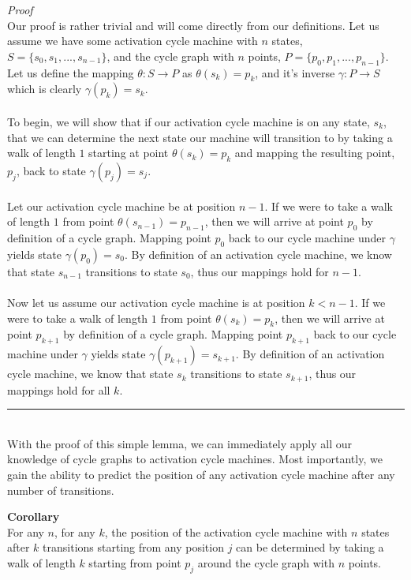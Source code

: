 \documentclass[a4paper,12pt]{article}
\begin{document}
\noindent
\textit{Proof}\\
Our proof is rather trivial and will come directly from our definitions. Let us assume we have some activation cycle machine with $n$ states, $S = \{s_0, s_1, ..., s_{n-1}\}$, and the cycle graph with $n$ points, $P = \{p_0, p_1, ..., p_{n-1}\}$. Let us define the mapping $\theta: S \rightarrow P$ as $\theta(s_k) = p_k$, and it's inverse $\gamma: P \rightarrow S$ which is clearly $\gamma(p_k) = s_k$.\\
\\
To begin, we will show that if our activation cycle machine is on any state, $s_k$, that we can determine the next state our machine will transition to by taking a walk of length $1$ starting at point $\theta(s_k) = p_k$ and mapping the resulting point, $p_j$, back to state $\gamma(p_j) = s_j$.\\
\\
Let our activation cycle machine be at position $n - 1$. If we were to take a walk of length $1$ from point $\theta(s_{n-1}) = p_{n-1}$, then we will arrive at point $p_0$ by definition of a cycle graph. Mapping point $p_0$ back to our cycle machine under $\gamma$ yields state $\gamma(p_0) = s_0$. By definition of an activation cycle machine, we know that state $s_{n-1}$ transitions to state $s_0$, thus our mappings hold for $n - 1$.\\
\\
Now let us assume our activation cycle machine is at position $k < n - 1$. If we were to take a walk of length $1$ from point $\theta(s_k) = p_k$, then we will arrive at point $p_{k+1}$ by definition of a cycle graph. Mapping point $p_{k+1}$ back to our cycle machine under $\gamma$ yields state $\gamma(p_{k+1}) = s_{k+1}$. By definition of an activation cycle machine, we know that state $s_k$ transitions to state $s_{k+1}$, thus our mappings hold for all $k$.
\begin{center}
\noindent\rule{8cm}{0.4pt}
\end{center}
\noindent
\\
With the proof of this simple lemma, we can immediately apply all our knowledge of cycle graphs to activation cycle machines. Most importantly, we gain the ability to predict the position of any activation cycle machine after any number of transitions.\\
\begin{tcolorbox}
\textbf{Corollary}\\
For any $n$, for any $k$, the position of the activation cycle machine with $n$ states after $k$ transitions starting from any position $j$ can be determined by taking a walk of length $k$ starting from point $p_j$ around the cycle graph with $n$ points.
\end{tcolorbox}
\end{document}
